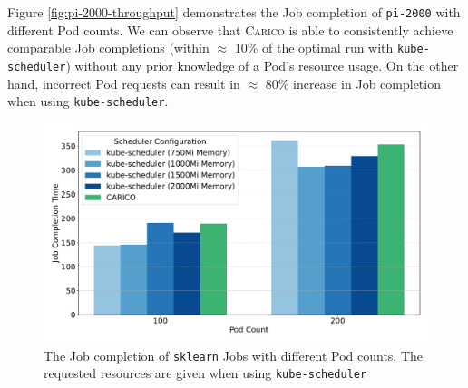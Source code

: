 Figure \ref{fig:pi-2000-throughput} demonstrates the Job completion of
\texttt{pi-2000} with different Pod counts. We can observe that \textsc{Carico}
is able to consistently achieve comparable Job completions (within $\approx$
10\% of the optimal run with \texttt{kube-scheduler}) without any prior
knowledge of a Pod's resource usage. On the other hand, incorrect Pod requests
can result in $\approx$ 80\% increase in Job completion when using
\texttt{kube-scheduler}.


\begin{figure}[ht!]
    \centering
    \includegraphics[width=\textwidth]{images/ml-job-completion.pdf}
    \caption{The Job completion of \texttt{sklearn} Jobs with different Pod
    counts. The requested resources are given when using
    \texttt{kube-scheduler}}
    \label{fig:ml-throughput}
\end{figure}


